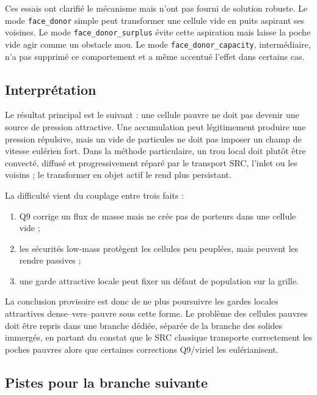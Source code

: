 \documentclass[11pt,a4paper]{article}
\begin{document}
Ces essais ont clarifié le mécanisme mais n'ont pas fourni de solution robuste. Le mode \texttt{face\_donor} simple peut transformer une cellule vide en puits aspirant ses voisines. Le mode \texttt{face\_donor\_surplus} évite cette aspiration mais laisse la poche vide agir comme un obstacle mou. Le mode \texttt{face\_donor\_capacity}, intermédiaire, n'a pas supprimé ce comportement et a même accentué l'effet dans certains cas.

\subsection{Interprétation}

Le résultat principal est le suivant : une cellule pauvre ne doit pas devenir une source de pression attractive. Une accumulation peut légitimement produire une pression répulsive, mais un vide de particules ne doit pas imposer un champ de vitesse eulérien fort. Dans la méthode particulaire, un trou local doit plutôt être convecté, diffusé et progressivement réparé par le transport SRC, l'inlet ou les voisins ; le transformer en objet actif le rend plus persistant.

La difficulté vient du couplage entre trois faits :
\begin{enumerate}
  \item Q9 corrige un flux de masse mais ne crée pas de porteurs dans une cellule vide ;
  \item les sécurités low-mass protègent les cellules peu peuplées, mais peuvent les rendre passives ;
  \item une garde attractive locale peut fixer un défaut de population sur la grille.
\end{enumerate}

La conclusion provisoire est donc de ne plus poursuivre les gardes locales attractives dense--vers--pauvre sous cette forme. Le problème des cellules pauvres doit être repris dans une branche dédiée, séparée de la branche des solides immergés, en partant du constat que le SRC classique transporte correctement les poches pauvres alors que certaines corrections Q9/viriel les eulérianisent.

\subsection{Pistes pour la branche suivante}
\end{document}
